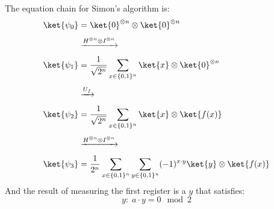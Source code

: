 \highspace
\begin{takeawaysbox}
    The equation chain for Simon's algorithm is:
    \begin{align*}
        \ket{\psi_{0}} &= \ket{0}^{\otimes n} \otimes \ket{0}^{\otimes n} \\[.3em]
        &\xrightarrow{H^{\otimes n} \otimes I^{\otimes n}} \\[.3em]
        \ket{\psi_{1}} &= \frac{1}{\sqrt{2^n}} \sum_{x \in \{0,1\}^n} \ket{x} \otimes \ket{0}^{\otimes n} \\[.3em]
        &\xrightarrow{U_f} \\[.3em]
        \ket{\psi_{2}} &= \frac{1}{\sqrt{2^n}} \sum_{x \in \{0,1\}^n} \ket{x} \otimes \ket{f(x)} \\[.3em]
        &\xrightarrow{H^{\otimes n} \otimes I^{\otimes n}} \\[.3em]
        \ket{\psi_{3}} &= \frac{1}{2^n} \sum_{x \in \{0,1\}^n} \sum_{y \in \{0,1\}^n} (-1)^{x \cdot y} \ket{y} \otimes \ket{f(x)}
    \end{align*}
    And the result of measuring the first register is a $y$ that satisfies:
    \begin{equation*}
        y: \; a \cdot y = 0 \mod 2
    \end{equation*}
\end{takeawaysbox}